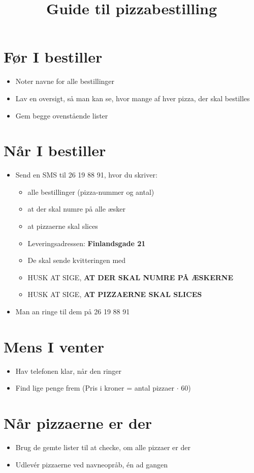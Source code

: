 \documentclass[a4paper,danish]{article}
\title{Guide til pizzabestilling}
\author{}
\date{}
\begin{document}
\maketitle

\section{Før I bestiller}
\begin{itemize}
  \item Noter navne for alle bestillinger
  \item Lav en oversigt, så man kan se, hvor mange af hver pizza, der skal bestilles
    \item Gem begge ovenstående lister
\end{itemize}
\section{Når I bestiller}
\begin{itemize}
  \item Send en SMS til 26 19 88 91, hvor du skriver:
    \begin{itemize}
      \item alle bestillinger (pizza-nummer og antal)
      \item at der skal numre på alle æsker
      \item at pizzaerne skal slices 
      \item Leveringsadressen: \textbf{Finlandsgade 21}
      \item De skal sende kvitteringen med
      \item HUSK AT SIGE, \textbf{AT DER SKAL NUMRE PÅ ÆSKERNE}
      \item HUSK AT SIGE, \textbf{AT PIZZAERNE SKAL SLICES} 
    \end{itemize}
  \item Man an ringe til dem på 26 19 88 91
\end{itemize}

\section{Mens I venter}
\begin{itemize}
  \item Hav telefonen klar, når den ringer
  \item Find lige penge frem (Pris i kroner = antal pizzaer $\cdot$ 60)
\end{itemize}

\section{Når pizzaerne er der}
\begin{itemize}
  \item Brug de gemte lister til at checke, om alle pizzaer er der
  \item Udlevér pizzaerne ved navneopråb, én ad gangen
\end{itemize}
\end{document}

